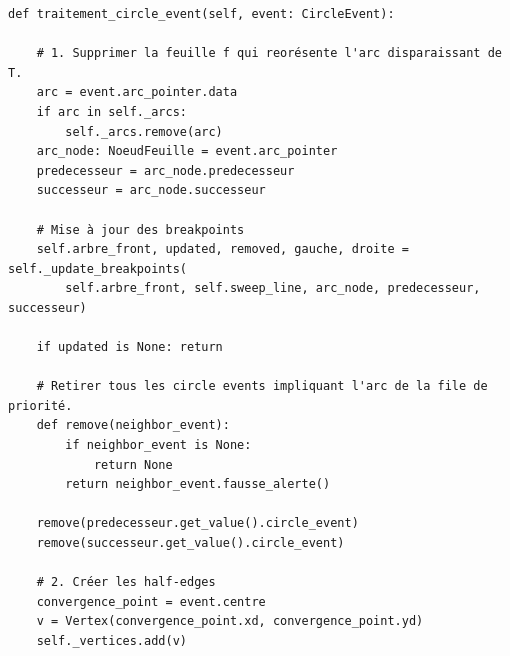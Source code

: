 \begin{frame}[fragile]
\begin{code}
\begin{verbatim}
def traitement_circle_event(self, event: CircleEvent):

    # 1. Supprimer la feuille f qui reorésente l'arc disparaissant de T.
    arc = event.arc_pointer.data
    if arc in self._arcs:
        self._arcs.remove(arc)
    arc_node: NoeudFeuille = event.arc_pointer
    predecesseur = arc_node.predecesseur
    successeur = arc_node.successeur

    # Mise à jour des breakpoints
    self.arbre_front, updated, removed, gauche, droite = self._update_breakpoints(
        self.arbre_front, self.sweep_line, arc_node, predecesseur, successeur)

    if updated is None: return

    # Retirer tous les circle events impliquant l'arc de la file de priorité.
    def remove(neighbor_event):
        if neighbor_event is None:
            return None
        return neighbor_event.fausse_alerte()

    remove(predecesseur.get_value().circle_event)
    remove(successeur.get_value().circle_event)

    # 2. Créer les half-edges
    convergence_point = event.centre
    v = Vertex(convergence_point.xd, convergence_point.yd)
    self._vertices.add(v)
\end{verbatim}
\end{code}
\end{frame}

